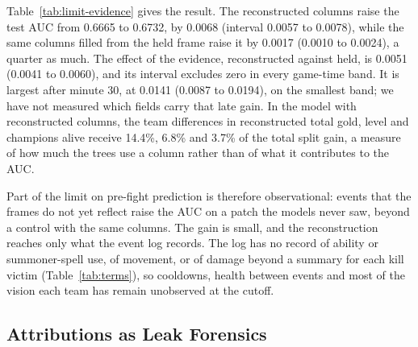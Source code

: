 Table~\ref{tab:limit-evidence} gives the result. The reconstructed columns raise the test AUC from 0.6665
to 0.6732, by 0.0068 (interval 0.0057 to 0.0078), while the same columns filled from the held frame raise
it by 0.0017 (0.0010 to 0.0024), a quarter as much. The effect of the evidence, reconstructed against
held, is 0.0051 (0.0041 to 0.0060), and its interval excludes zero in every game-time band. It is largest
after minute 30, at 0.0141 (0.0087 to 0.0194), on the smallest band; we have not measured which fields
carry that late gain. In the model with reconstructed columns, the team differences in reconstructed total
gold, level and champions alive receive 14.4\%, 6.8\% and 3.7\% of the total split gain, a measure of how
much the trees use a column rather than of what it contributes to the AUC.

Part of the limit on pre-fight prediction is therefore observational: events that the frames do not yet
reflect raise the AUC on a patch the models never saw, beyond a control with the same columns. The gain
is small, and the reconstruction reaches only what the event log records. The log has no record of
ability or summoner-spell use, of movement, or of damage beyond a summary for each kill victim
(Table~\ref{tab:terms}), so cooldowns, health between events and most of the vision each team has remain
unobserved at the cutoff.

\subsection{Attributions as Leak Forensics}\label{sec:limit-shap}

